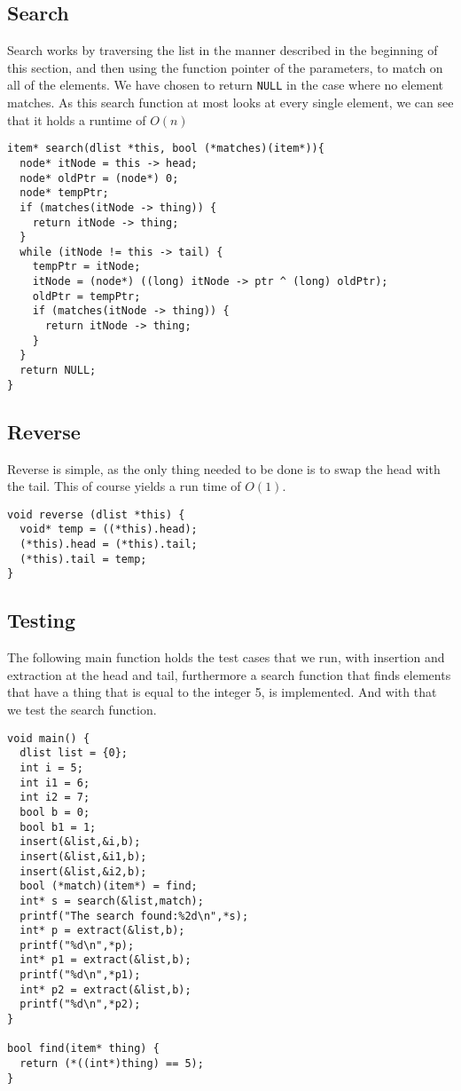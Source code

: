 \documentclass[a4paper,12pt]{article}
\begin{document}
\subsection{Search}
Search works by traversing the list in the manner described in the beginning of this section, and then using the function pointer of the parameters, to match on all of the elements. We have chosen to return \texttt{NULL} in the case where no element matches. As this search function at most looks at every single element, we can see that it holds a runtime of $O(n)$
\begin{lstlisting}
item* search(dlist *this, bool (*matches)(item*)){
  node* itNode = this -> head;
  node* oldPtr = (node*) 0;
  node* tempPtr;
  if (matches(itNode -> thing)) {
    return itNode -> thing;
  }
  while (itNode != this -> tail) {
    tempPtr = itNode;
    itNode = (node*) ((long) itNode -> ptr ^ (long) oldPtr);
    oldPtr = tempPtr;
    if (matches(itNode -> thing)) {
      return itNode -> thing;
    }
  }
  return NULL;
}
\end{lstlisting}

\subsection{Reverse}
Reverse is simple, as the only thing needed to be done is to swap the head with the tail. This of course yields a run time of $O(1)$.
\begin{lstlisting}
void reverse (dlist *this) {
  void* temp = ((*this).head);
  (*this).head = (*this).tail;
  (*this).tail = temp;
}
\end{lstlisting}
\newpage
\subsection{Testing}
The following main function holds the test cases that we run, with insertion and extraction at the head and tail, furthermore a search function that finds elements that have a thing that is equal to the integer 5, is implemented. And with that we test the search function.
\begin{lstlisting}
void main() {
  dlist list = {0};
  int i = 5;
  int i1 = 6;
  int i2 = 7;
  bool b = 0;
  bool b1 = 1;
  insert(&list,&i,b);
  insert(&list,&i1,b);
  insert(&list,&i2,b);
  bool (*match)(item*) = find;
  int* s = search(&list,match);
  printf("The search found:%2d\n",*s);
  int* p = extract(&list,b);
  printf("%d\n",*p);
  int* p1 = extract(&list,b);
  printf("%d\n",*p1);
  int* p2 = extract(&list,b);
  printf("%d\n",*p2);
}

bool find(item* thing) { 
  return (*((int*)thing) == 5);
} 
\end{lstlisting}
\newpage
\end{document}
